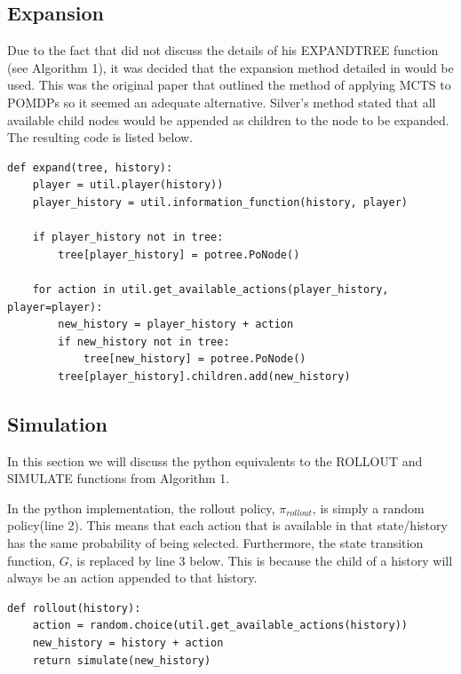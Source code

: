 \subsection{Expansion}\label{subsec:expansion}
Due to the fact that\citep{heinrich2017reinforcement} did not discuss the details of his EXPANDTREE
function (see Algorithm 1), it was decided that the expansion method detailed
in\citep{silver2010monte} would be used.
This was the original paper that outlined the method of applying MCTS to POMDPs so it seemed
an adequate alternative.
Silver's method stated that all available child nodes would be appended as children to the node to be expanded.
The resulting code is listed below.

\begin{lstlisting}[style=Python]
def expand(tree, history):
    player = util.player(history))
    player_history = util.information_function(history, player)

    if player_history not in tree:
        tree[player_history] = potree.PoNode()

    for action in util.get_available_actions(player_history, player=player):
        new_history = player_history + action
        if new_history not in tree:
            tree[new_history] = potree.PoNode()
        tree[player_history].children.add(new_history)
\end{lstlisting}


\subsection{Simulation}\label{subsec:simulation}
In this section we will discuss the python equivalents to the ROLLOUT and SIMULATE functions from Algorithm 1.

In the python implementation, the rollout policy, $\pi_{rollout}$, is simply a random policy(line 2).
This means that each action that is available in that state/history has the same probability of being selected.
Furthermore, the state transition function, $G$, is replaced by line 3 below.
This is because the child of a history will always be an action appended to that history.

\begin{lstlisting}[style=Python]
def rollout(history):
    action = random.choice(util.get_available_actions(history))
    new_history = history + action
    return simulate(new_history)
\end{lstlisting}

